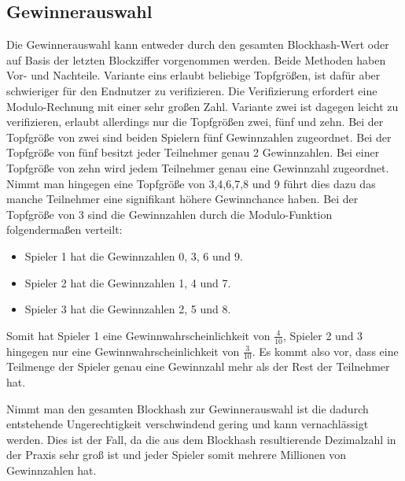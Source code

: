 \subsection{Gewinnerauswahl}\label{btc_gewinnerauswahl}
Die Gewinnerauswahl kann entweder durch den gesamten Blockhash-Wert oder auf Basis der letzten Blockziffer vorgenommen werden.
Beide Methoden haben Vor- und Nachteile. Variante eins erlaubt beliebige Topfgrößen, ist dafür aber schwieriger für den Endnutzer zu verifizieren. Die Verifizierung erfordert eine Modulo-Rechnung mit einer sehr großen Zahl. Variante zwei ist dagegen leicht zu verifizieren, erlaubt allerdings nur die Topfgrößen zwei, fünf und zehn. Bei der Topfgröße von zwei sind beiden Spielern fünf Gewinnzahlen zugeordnet. Bei der Topfgröße von fünf besitzt jeder Teilnehmer genau 2 Gewinnzahlen. Bei einer Topfgröße von zehn wird jedem Teilnehmer genau eine Gewinnzahl zugeordnet. 
Nimmt man hingegen eine Topfgröße von 3,4,6,7,8 und 9 führt dies dazu das manche Teilnehmer eine signifikant höhere Gewinnchance haben.
Bei der Topfgröße von 3 sind die Gewinnzahlen durch die Modulo-Funktion folgendermaßen verteilt:
\begin{itemize}
\item Spieler 1 hat die Gewinnzahlen 0, 3, 6 und 9.
\item Spieler 2 hat die Gewinnzahlen 1, 4 und 7.
\item Spieler 3 hat die Gewinnzahlen 2, 5 und 8.
\end{itemize}
Somit hat Spieler 1 eine Gewinnwahrscheinlichkeit von $\frac{4}{10}$, Spieler 2 und 3 hingegen nur eine Gewinnwahrscheinlichkeit von $\frac{3}{10}$. Es kommt also vor, dass eine Teilmenge der Spieler genau eine Gewinnzahl mehr als der Rest der Teilnehmer hat.

Nimmt man den gesamten Blockhash zur Gewinnerauswahl ist die dadurch entstehende Ungerechtigkeit verschwindend gering und kann vernachlässigt werden. Dies ist der Fall, da die aus dem Blockhash resultierende Dezimalzahl in der Praxis sehr groß ist und jeder Spieler somit mehrere Millionen von Gewinnzahlen hat.

